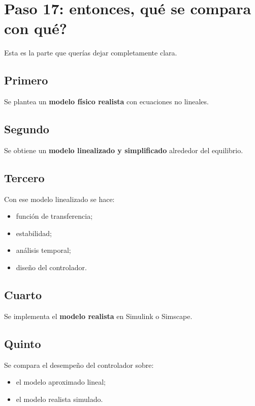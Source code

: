 \documentclass[11pt]{article}
\begin{document}
\section{Paso 17: entonces, \textbf{qu\'e se compara con qu\'e}?}

Esta es la parte que quer\'ias dejar completamente clara.

\subsection{Primero}

Se plantea un \textbf{modelo f\'isico realista} con ecuaciones no lineales.

\subsection{Segundo}

Se obtiene un \textbf{modelo linealizado y simplificado} alrededor del equilibrio.

\subsection{Tercero}

Con ese modelo linealizado se hace:

\begin{itemize}[leftmargin=1.2cm]
\item funci\'on de transferencia;
\item estabilidad;
\item an\'alisis temporal;
\item dise\~no del controlador.
\end{itemize}

\subsection{Cuarto}

Se implementa el \textbf{modelo realista} en Simulink o Simscape.

\subsection{Quinto}

Se compara el desempe\~no del controlador sobre:

\begin{itemize}[leftmargin=1.2cm]
\item el modelo aproximado lineal;
\item el modelo realista simulado.
\end{itemize}
\end{document}
